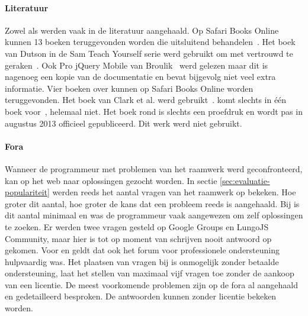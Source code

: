 \paragraph{Literatuur}
Zowel \jqm{} als \st{} werden vaak in de literatuur aangehaald.
Op Safari Books Online kunnen 13 boeken teruggevonden worden die uitsluitend \jqm{} behandelen~\cite{O'Reilly2013}.
Het boek van Dutson in de Sam Teach Yourself serie werd gebruikt om met \jqm{} vertrouwd te geraken~\cite{PhilDutson2012}.
Ook Pro jQuery Mobile van Broulik~\cite{Broulik2012} werd gelezen maar dit is nagenoeg een kopie van de documentatie en bevat bijgevolg niet veel extra informatie.
Vier boeken over \st{} kunnen op Safari Books Online worden teruggevonden.
Het boek van Clark et al. werd gebruikt~\cite{JohnEClark2012}.
\kendo{} komt slechts in één boek voor~\cite{Bhandari2013},  \lungo{} helemaal niet.
Het boek rond \kendo{} is slechts een proefdruk en wordt pas in augustus 2013 officieel gepubliceerd.
Dit werk werd niet gebruikt.


\paragraph{Fora}
Wanneer de programmeur met problemen van het raamwerk werd geconfronteerd, kan op het web naar oplossingen gezocht worden.
In sectie \ref{sec:evaluatie-populariteit} werden reeds het aantal vragen van het raamwerk op \so{} bekeken.
Hoe groter dit aantal,  hoe groter de kans dat een probleem reeds is aangehaald.
Bij \lungo{} is dit aantal minimaal en was de programmeur vaak aangewezen om zelf oplossingen te zoeken.
Er werden twee vragen gesteld op Google Groups en LungoJS Community, maar hier is tot op moment van schrijven nooit antwoord op gekomen.
Voor \st{} en \kendo{} geldt dat ook het forum voor professionele ondersteuning hulpvaardig was.
Het plaatsen van vragen bij \st{} is onmogelijk zonder betaalde ondersteuning,  \kendo{} laat het stellen van maximaal vijf vragen toe zonder de aankoop van een licentie.
De meest voorkomende problemen zijn op de fora al aangehaald en gedetailleerd besproken.
De antwoorden kunnen zonder licentie bekeken worden.